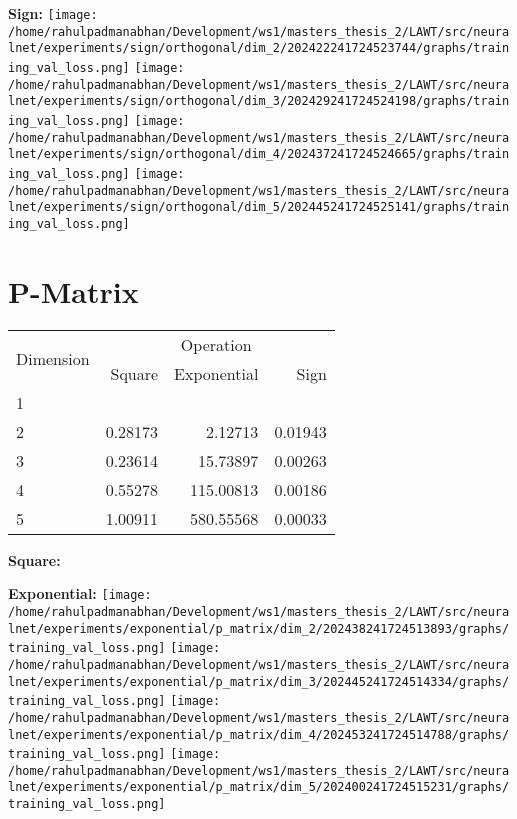 \documentclass{article}
\begin{document}
\textbf{Sign:}
\texttt{[image: /home/rahulpadmanabhan/Development/ws1/masters\_thesis\_2/LAWT/src/neuralnet/experiments/sign/orthogonal/dim\_2/202422241724523744/graphs/training\_val\_loss.png]}
\texttt{[image: /home/rahulpadmanabhan/Development/ws1/masters\_thesis\_2/LAWT/src/neuralnet/experiments/sign/orthogonal/dim\_3/202429241724524198/graphs/training\_val\_loss.png]}
\texttt{[image: /home/rahulpadmanabhan/Development/ws1/masters\_thesis\_2/LAWT/src/neuralnet/experiments/sign/orthogonal/dim\_4/202437241724524665/graphs/training\_val\_loss.png]}
\texttt{[image: /home/rahulpadmanabhan/Development/ws1/masters\_thesis\_2/LAWT/src/neuralnet/experiments/sign/orthogonal/dim\_5/202445241724525141/graphs/training\_val\_loss.png]}

\pagebreak
\section{P-Matrix}
\begin{tabular}{@{}lrrr@{}}
\toprule
\multirow{2}{*}{Dimension} & \multicolumn{3}{c}{Operation} \\
\cmidrule(l){2-4}
& Square & Exponential & Sign \\
\midrule
1 & & & \\
2 & 0.28173 & 2.12713 & 0.01943 \\
3 & 0.23614 & 15.73897 & 0.00263 \\
4 & 0.55278 & 115.00813 & 0.00186 \\
5 & 1.00911 & 580.55568 & 0.00033 \\
\bottomrule
\end{tabular}

\textbf{Square:}

\textbf{Exponential:}
\texttt{[image: /home/rahulpadmanabhan/Development/ws1/masters\_thesis\_2/LAWT/src/neuralnet/experiments/exponential/p\_matrix/dim\_2/202438241724513893/graphs/training\_val\_loss.png]}
\texttt{[image: /home/rahulpadmanabhan/Development/ws1/masters\_thesis\_2/LAWT/src/neuralnet/experiments/exponential/p\_matrix/dim\_3/202445241724514334/graphs/training\_val\_loss.png]}
\texttt{[image: /home/rahulpadmanabhan/Development/ws1/masters\_thesis\_2/LAWT/src/neuralnet/experiments/exponential/p\_matrix/dim\_4/202453241724514788/graphs/training\_val\_loss.png]}
\texttt{[image: /home/rahulpadmanabhan/Development/ws1/masters\_thesis\_2/LAWT/src/neuralnet/experiments/exponential/p\_matrix/dim\_5/202400241724515231/graphs/training\_val\_loss.png]}
\end{document}
